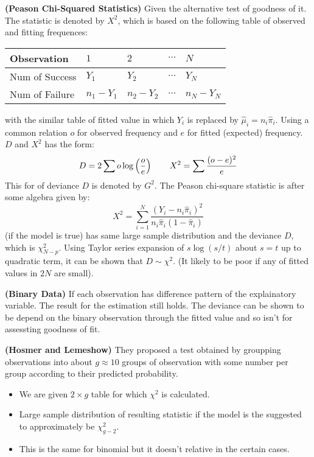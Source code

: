 \begin{remark}{\textbf{(Peason Chi-Squared Statistics)}}
    Given the alternative test of goodness of it. The statistic is denoted by $X^2$, which is based on the following table of observed and fitting frequences:
    \begin{table}[H]
    \centering
    \begin{tabular}{lllll}
        \toprule
        \textbf{Observation}   & $1$ & $2$ & $\cdots$ & $N$  \\
        \midrule
        Num of Success  & $Y_1$ & $Y_2$ & $\cdots$ & $Y_N$ \\
        Num of Failure  & $n_1-Y_1$ & $n_2-Y_2$ & $\cdots$ & $n_N-Y_N$ \\
        \bottomrule
    \end{tabular}
    \end{table}    
    with the similar table of fitted value in which $Y_i$ is replaced by $\hat{\mu}_i = n_i\hat{\pi}_i$. Using a common relation $o$ for observed frequency and $e$ for fitted (expected) frequency. $D$ and $X^2$ has the form:
    \begin{equation*}
        D = 2 \sum o \log\left( \frac{o}{e} \right) \qquad X^2 = \sum\frac{(o-e)^2}{e}
    \end{equation*}
    This for of deviance $D$ is denoted by $G^2$. The Peason chi-square statistic is after some algebra given by:
    \begin{equation*}
        X^2 = \sum^N_{i=1}\frac{(Y_i - n_i\hat{\pi}_i)^2}{n_i\hat{\pi}_i(1-\hat{\pi}_i)}
    \end{equation*}
    (if the model is true) has same large sample distribution and the deviance $D$, which is $\chi^2_{N-p}$. Using Taylor series expansion of $s\log(s/t)$ about $s=t$ up to quadratic term, it can be shown that $D\sim\chi^2$. (It likely to be poor if any of fitted values in $2N$ are small).
\end{remark}

\begin{remark}{\textbf{(Binary Data)}}
    If each observation has difference pattern of the explainatory variable. The result for the estimation still holds. The deviance can be shown to be depend on the binary observation through the fitted value and so isn't for assessting goodness of fit. 
\end{remark}

\begin{remark}{\textbf{(Hosmer and Lemeshow)}}
   They proposed a test obtained by groupping observations into about $g\approx10$ groups of observation with some number per group according to their predicted probability. 
   \begin{itemize}
       \item We are given $2\times g$ table for which $\chi^2$ is calculated. 
       \item Large sample distribution of resulting statistic if the model is the suggested to approximately be $\chi^2_{g-2}$. 
       \item This is the same for binomial but it doesn't relative in the certain cases. 
   \end{itemize} 
\end{remark}

